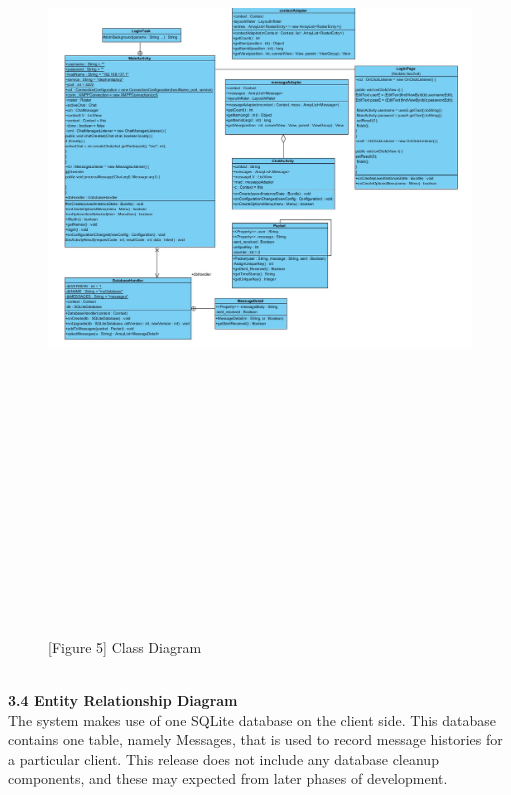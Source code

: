 \documentclass[29pt,a4paper]{moderncv}
\begin{document}
			\begin{figure}
				\centering
				\\ \includegraphics[width=7.0in, height=8.5in]{./Class_Diagram.jpg}
				\\\caption{[Figure 5] Class Diagram}\\
			\end{figure}
	
	\\ \noindent \textbf{3.4 Entity Relationship Diagram}
	\\The system makes use of one SQLite database on the client side.  This database contains one table, namely Messages, that is used to record message histories for a particular client.  This release does not include any database cleanup components, and these may expected from later phases of development.
	\\ \\
	
\end{document}
